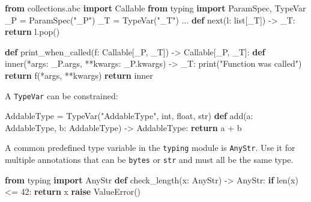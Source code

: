 \documentclass[
]{article}
\newenvironment{Shaded}{}{}
\newcommand{\BuiltInTok}[1]{\textcolor[rgb]{0.00,0.50,0.00}{#1}}
\newcommand{\ControlFlowTok}[1]{\textcolor[rgb]{0.00,0.44,0.13}{\textbf{#1}}}
\newcommand{\DecValTok}[1]{\textcolor[rgb]{0.25,0.63,0.44}{#1}}
\newcommand{\ImportTok}[1]{\textcolor[rgb]{0.00,0.50,0.00}{\textbf{#1}}}
\newcommand{\KeywordTok}[1]{\textcolor[rgb]{0.00,0.44,0.13}{\textbf{#1}}}
\newcommand{\NormalTok}[1]{#1}
\newcommand{\OperatorTok}[1]{\textcolor[rgb]{0.40,0.40,0.40}{#1}}
\newcommand{\PreprocessorTok}[1]{\textcolor[rgb]{0.74,0.48,0.00}{#1}}
\newcommand{\StringTok}[1]{\textcolor[rgb]{0.25,0.44,0.63}{#1}}
\begin{document}
\begin{samepage}
\begin{Shaded}
\begin{Highlighting}[]
\ImportTok{from}\NormalTok{ collections.abc }\ImportTok{import}\NormalTok{ Callable}
\ImportTok{from}\NormalTok{ typing }\ImportTok{import}\NormalTok{ ParamSpec, TypeVar}
\NormalTok{\_P }\OperatorTok{=}\NormalTok{ ParamSpec(}\StringTok{"\_P"}\NormalTok{)}
\NormalTok{\_T }\OperatorTok{=}\NormalTok{ TypeVar(}\StringTok{"\_T"}\NormalTok{)}
\NormalTok{...}
\KeywordTok{def} \BuiltInTok{next}\NormalTok{(l: }\BuiltInTok{list}\NormalTok{[\_T]) }\OperatorTok{{-}\textgreater{}}\NormalTok{ \_T:}
  \ControlFlowTok{return}\NormalTok{ l.pop()}

\KeywordTok{def}\NormalTok{ print\_when\_called(f: Callable[\_P, \_T]) }\OperatorTok{{-}\textgreater{}}\NormalTok{ Callable[\_P, \_T]:}
  \KeywordTok{def}\NormalTok{ inner(}\OperatorTok{*}\NormalTok{args: \_P.args, }\OperatorTok{**}\NormalTok{kwargs: \_P.kwargs) }\OperatorTok{{-}\textgreater{}}\NormalTok{ \_T:}
    \BuiltInTok{print}\NormalTok{(}\StringTok{"Function was called"}\NormalTok{)}
    \ControlFlowTok{return}\NormalTok{ f(}\OperatorTok{*}\NormalTok{args, }\OperatorTok{**}\NormalTok{kwargs)}
  \ControlFlowTok{return}\NormalTok{ inner}
\end{Highlighting}
\end{Shaded}
\end{samepage}

A \texttt{TypeVar} can be constrained:

\begin{samepage}
\begin{Shaded}
\begin{Highlighting}[]
\NormalTok{AddableType }\OperatorTok{=}\NormalTok{ TypeVar(}\StringTok{"AddableType"}\NormalTok{, }\BuiltInTok{int}\NormalTok{, }\BuiltInTok{float}\NormalTok{, }\BuiltInTok{str}\NormalTok{)}
\KeywordTok{def}\NormalTok{ add(a: AddableType, b: AddableType) }\OperatorTok{{-}\textgreater{}}\NormalTok{ AddableType:}
  \ControlFlowTok{return}\NormalTok{ a }\OperatorTok{+}\NormalTok{ b}
\end{Highlighting}
\end{Shaded}
\end{samepage}

A common predefined type variable in the \texttt{typing} module is
\texttt{AnyStr}. Use it for multiple annotations that can be
\texttt{bytes} or \texttt{str} and must all be the same type.

\begin{samepage}
\begin{Shaded}
\begin{Highlighting}[]
\ImportTok{from}\NormalTok{ typing }\ImportTok{import}\NormalTok{ AnyStr}
\KeywordTok{def}\NormalTok{ check\_length(x: AnyStr) }\OperatorTok{{-}\textgreater{}}\NormalTok{ AnyStr:}
  \ControlFlowTok{if} \BuiltInTok{len}\NormalTok{(x) }\OperatorTok{\textless{}=} \DecValTok{42}\NormalTok{:}
    \ControlFlowTok{return}\NormalTok{ x}
  \ControlFlowTok{raise} \PreprocessorTok{ValueError}\NormalTok{()}
\end{Highlighting}
\end{Shaded}
\end{samepage}
\end{document}
